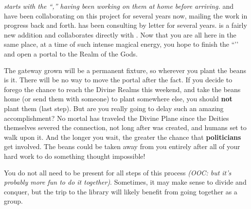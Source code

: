 \documentclass[green]{GL2020}
\begin{document}
\name{\gMagicBeans{}}

\emph{\cCurse{} starts with the ``\iBeansNB{},'' having been working on them at home before arriving.} \cFlowPriest{\full} and \cCurse{\full} have been collaborating on this project for several years now, mailing the work in progress back and forth. \cAssistantScientist{\full} has been consulting by letter for several years. \cAmbition{\full} is a fairly new addition and collaborates directly with \cFlowPriest{}. Now that you are all here in the same place, at a time of such intense magical energy, you hope to finish the ``\iBeansNB{}’’ and open a portal to the Realm of the Gods.

The gateway grown will be a permanent fixture, so wherever you plant the beans is it. There will be no way to move the portal after the fact. If you decide to forego the chance to reach the Divine Realms this weekend, and take the beans home (or send them with someone) to plant somewhere else, you should \textbf{not} plant them (last step). But are you really going to delay such an amazing accomplishment? No mortal has traveled the Divine Plane since the Deities themselves severed the connection, not long after \pEarth{} was created, and humans set to walk upon it. And the longer you wait, the greater the chance that \textbf{politicians} get involved. The beans could be taken away from you entirely after all of your hard work to do something thought impossible! 

You do not all need to be present for all steps of this process \emph{(OOC: but it’s probably more fun to do it together)}. Sometimes, it may make sense to divide and conquer, but the trip to the library will likely benefit from going together as a group.
\end{document}
